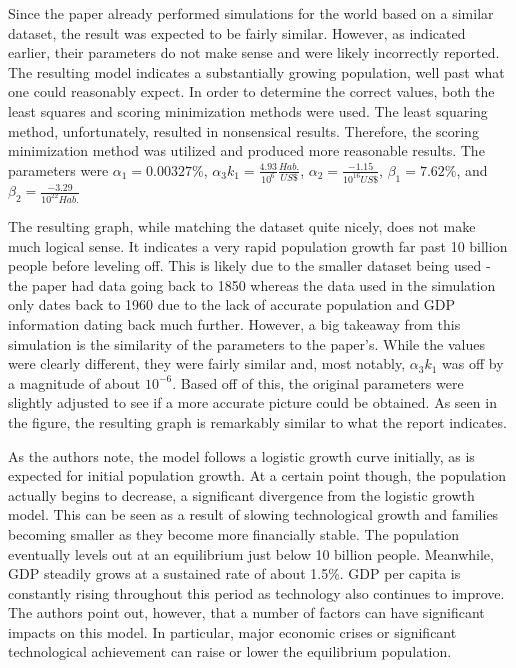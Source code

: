 \documentclass[a4paper]{article}
\begin{document}
Since the paper already performed simulations for the world based on a similar dataset, the result was expected to be fairly similar. However, as indicated earlier, their parameters do not make sense and were likely incorrectly reported. The resulting model indicates a substantially growing population, well past what one could reasonably expect. In order to determine the correct values, both the least squares and scoring minimization methods were used. The least squaring method, unfortunately, resulted in nonsensical results. Therefore, the scoring minimization method was utilized and produced more reasonable results. The parameters were $\alpha_1 =0.00327\%$, $\alpha_3 k_1 = \frac{4.93}{10^6} \frac{Hab.}{US \$}$, $\alpha_2 = \frac{-1.15}{10^{16} US \$}$, $\beta_1 = 7.62\%$, and $\beta_2 = \frac{-3.29}{10^{22} Hab.}$ 

The resulting graph, while matching the dataset quite nicely, does not make much logical sense. It indicates a very rapid population growth far past 10 billion people before leveling off. This is likely due to the smaller dataset being used - the paper had data going back to 1850 whereas the data used in the simulation only dates back to 1960 due to the lack of accurate population and GDP information dating back much further. However, a big takeaway from this simulation is the similarity of the parameters to the paper's. While the values were clearly different, they were fairly similar and, most notably, $\alpha_3 k_1$ was off by a magnitude of about $10^{-6}$. Based off of this, the original parameters were slightly adjusted to see if a more accurate picture could be obtained. As seen in the figure, the resulting graph is remarkably similar to what the report indicates. 

As the authors note, the model follows a logistic growth curve initially, as is expected for initial population growth. At a certain point though, the population actually begins to decrease, a significant divergence from the logistic growth model. This can be seen as a result of slowing technological growth and families becoming smaller as they become more financially stable. The population eventually levels out at an equilibrium just below 10 billion people. Meanwhile, GDP steadily grows at a sustained rate of about 1.5\%. GDP per capita is constantly rising throughout this period as technology also continues to improve. The authors point out, however, that a number of factors can have significant impacts on this model. In particular, major economic crises or significant technological achievement can raise or lower the equilibrium population. 
\end{document}
